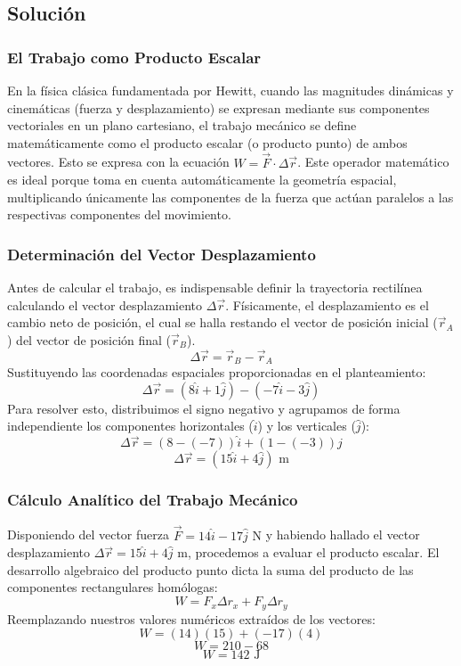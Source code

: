\documentclass[a4paper,12pt]{article}
\begin{document}
\subsection*{Solución}

\subsubsection*{El Trabajo como Producto Escalar}
En la física clásica fundamentada por Hewitt, cuando las magnitudes dinámicas y cinemáticas (fuerza y desplazamiento) se expresan mediante sus componentes vectoriales en un plano cartesiano, el trabajo mecánico se define matemáticamente como el producto escalar (o producto punto) de ambos vectores. Esto se expresa con la ecuación $W = \vec{F} \cdot \Delta\vec{r}$. Este operador matemático es ideal porque toma en cuenta automáticamente la geometría espacial, multiplicando únicamente las componentes de la fuerza que actúan paralelos a las respectivas componentes del movimiento.

\subsubsection*{Determinación del Vector Desplazamiento}
Antes de calcular el trabajo, es indispensable definir la trayectoria rectilínea calculando el vector desplazamiento $\Delta\vec{r}$. Físicamente, el desplazamiento es el cambio neto de posición, el cual se halla restando el vector de posición inicial ($\vec{r}_A$) del vector de posición final ($\vec{r}_B$).
$$\Delta\vec{r} = \vec{r}_B - \vec{r}_A$$
Sustituyendo las coordenadas espaciales proporcionadas en el planteamiento:
$$\Delta\vec{r} = (8\hat{i} + 1\hat{j}) - (-7\hat{i} - 3\hat{j})$$
Para resolver esto, distribuimos el signo negativo y agrupamos de forma independiente los componentes horizontales ($\hat{i}$) y los verticales ($\hat{j}$):
$$\Delta\vec{r} = (8 - (-7))\hat{i} + (1 - (-3))\hat{j}$$
$$\Delta\vec{r} = (15\hat{i} + 4\hat{j})\text{ m}$$

\subsubsection*{Cálculo Analítico del Trabajo Mecánico}
Disponiendo del vector fuerza $\vec{F} = 14\hat{i} - 17\hat{j}\text{ N}$ y habiendo hallado el vector desplazamiento $\Delta\vec{r} = 15\hat{i} + 4\hat{j}\text{ m}$, procedemos a evaluar el producto escalar. El desarrollo algebraico del producto punto dicta la suma del producto de las componentes rectangulares homólogas:
$$W = F_x \Delta r_x + F_y \Delta r_y$$
Reemplazando nuestros valores numéricos extraídos de los vectores:
$$W = (14)(15) + (-17)(4)$$
$$W = 210 - 68$$
$$W = 142\text{ J}$$
\end{document}
